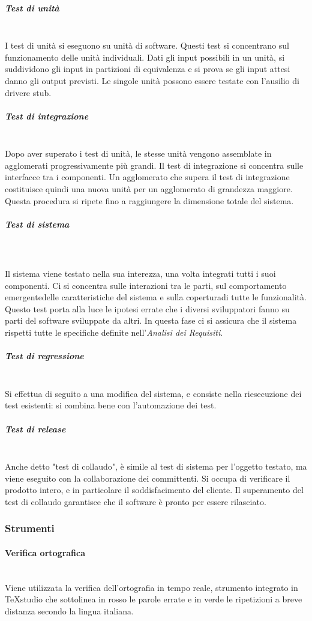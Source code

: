 			\subparagraph{Test di unità} \mbox{}\\
			I test di unità si eseguono su unità di software. Questi test si concentrano sul funzionamento delle unità individuali. Dati gli input possibili in un unità, si suddividono gli input in partizioni di equivalenza e si prova se gli input attesi danno gli output previsti. Le singole unità possono essere testate con l'ausilio di driver\glosp e stub\glosp.
			\subparagraph{Test di integrazione} \mbox{}\\
			Dopo aver superato i test di unità, le stesse unità vengono assemblate in agglomerati progressivamente più grandi. Il test di integrazione si concentra sulle interfacce tra i componenti. Un agglomerato che supera il test di integrazione costituisce quindi una nuova unità per un agglomerato di grandezza maggiore. Questa procedura si ripete fino a raggiungere la dimensione totale del sistema.
			\subparagraph{Test di sistema} \mbox{}\\\\
			Il sistema viene testato nella sua interezza, una volta integrati tutti i suoi componenti. Ci si concentra sulle interazioni tra le parti, sul comportamento emergente\glosp delle caratteristiche del sistema e sulla copertura\glosp di tutte le funzionalità. Questo test porta alla luce le ipotesi errate che i diversi sviluppatori fanno su parti del software sviluppate da altri.
			In questa fase ci si assicura che il sistema rispetti tutte le specifiche definite nell'\textit{Analisi dei Requisiti}.
			\subparagraph{Test di regressione} \mbox{}\\
			Si effettua di seguito a una modifica del sistema, e consiste nella riesecuzione dei test esistenti: si combina bene con l'automazione dei test.
			\subparagraph{Test di release} \mbox{}\\
			Anche detto "test di collaudo", è simile al test di sistema per l'oggetto testato, ma viene eseguito con la collaborazione dei committenti. Si occupa di verificare il prodotto intero, e in particolare il soddisfacimento del cliente. Il superamento del test di collaudo garantisce che il software è pronto per essere rilasciato.
	\subsubsection{Strumenti}
		\paragraph{Verifica ortografica} \mbox{}\\
		Viene utilizzata la verifica dell'ortografia in tempo reale, strumento integrato in TeXstudio che sottolinea in rosso le parole errate e in verde le ripetizioni a breve distanza secondo la lingua italiana.
